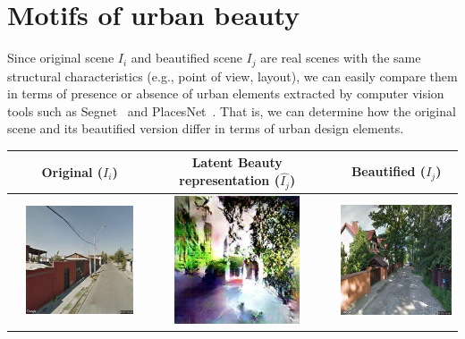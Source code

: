 \section{Motifs of urban beauty}
Since original scene $I_i$ and beautified scene $I_j$ are real scenes with the  same structural characteristics (e.g., point of view, layout), we can easily compare them in terms of presence or absence of urban elements extracted by computer vision tools such as Segnet~\cite{badrinarayanan2015segnet} and PlacesNet~\cite{zhou2014learning}. That is, we can determine how the original scene and its beautified version differ in terms of urban design elements. 

\begin{table}\sffamily
    \begin{tabular}{l*3{C}@{}}
        \toprule
        & Original ($I_i$) & Latent Beauty representation ($\hat{I_j}$) & Beautified ($I_j$) \\ 
        \midrule
        & \includegraphics[width=10em]{u_9.png} & \includegraphics[width=10em]{t_9.png} &  \includegraphics[width=10em]{b_9.png} \\ 

\end{tabular}
\end{table}
